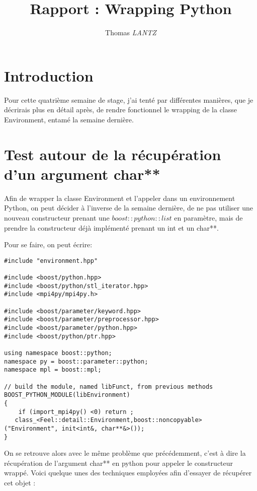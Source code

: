 \documentclass[12pt]{article}
\title {Rapport : Wrapping Python}
\author {Thomas \emph{LANTZ}}
\begin{document}
\maketitle 

\section{Introduction}

Pour cette quatrième semaine de stage, j'ai tenté par différentes manières, que je décrirais plus en détail après, de rendre fonctionnel le wrapping de la classe Environment, entamé la semaine dernière. 


\section{Test autour de la récupération d'un argument char** }

Afin de wrapper la classe Environment et l'appeler dans un environnement Python, on peut décider à l'inverse de la semaine dernière, de ne pas utiliser une nouveau constructeur prenant une $boost::python::list$ en paramètre, mais de prendre la constructeur déjà implémenté prenant un int et un char**.

Pour se faire, on peut écrire:

\begin{lstlisting}
#include "environment.hpp"

#include <boost/python.hpp>
#include <boost/python/stl_iterator.hpp>
#include <mpi4py/mpi4py.h>

#include <boost/parameter/keyword.hpp>
#include <boost/parameter/preprocessor.hpp>
#include <boost/parameter/python.hpp>
#include <boost/python/ptr.hpp>

using namespace boost::python;
namespace py = boost::parameter::python;
namespace mpl = boost::mpl;

// build the module, named libFunct, from previous methods
BOOST_PYTHON_MODULE(libEnvironment)
{
    if (import_mpi4py() <0) return ;
   class_<Feel::detail::Environment,boost::noncopyable> ("Environment", init<int&, char**&>());
}
\end{lstlisting}

On se retrouve alors avec le même problème que précédemment, c'est à dire la récupération de l'argument char** en python pour appeler le constructeur wrappé.
\newline
Voici quelque unes des techniques employées afin d'essayer de récupérer cet objet :
\end{document}
